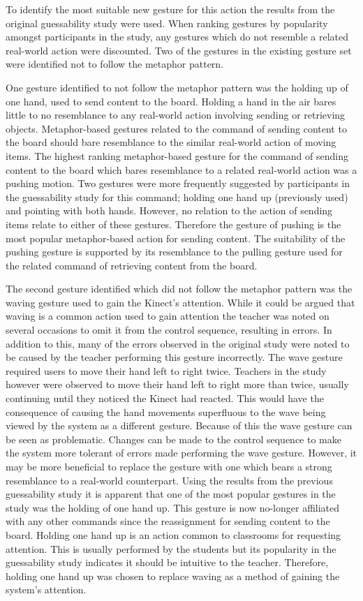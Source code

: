 \documentclass[link]{IWCOMP}
\begin{document}
To identify the most suitable new gesture for this action the results from the original guessability study were used.
When ranking gestures by popularity amongst participants in the study, any gestures which do not resemble a related real-world action were discounted.
Two of the gestures in the existing gesture set were identified not to follow the metaphor pattern.

One gesture identified to not follow the metaphor pattern was the holding up of one hand, used to send content to the board.
Holding a hand in the air bares little to no resemblance to any real-world action involving sending or retrieving objects.
Metaphor-based gestures related to the command of sending content to the board should bare resemblance to the similar real-world action of moving items.
The highest ranking metaphor-based gesture for the command of sending content to the board which bares resemblance to a related real-world action was a pushing motion.
Two gestures were more frequently suggested by participants in the guessability study for this command; holding one hand up (previously used) and pointing with both hands.
However, no relation to the action of sending items relate to either of these gestures.
Therefore the gesture of pushing is the most popular metaphor-based action for sending content.
The suitability of the pushing gesture is supported by its resemblance to the pulling gesture used for the related command of retrieving content from the board.

The second gesture identified which did not follow the metaphor pattern was the waving gesture used to gain the Kinect's attention.
While it could be argued that waving is a common action used to gain attention the teacher was noted on several occasions to omit it from the control sequence, resulting in errors.
In addition to this, many of the errors observed in the original study were noted to be caused by the teacher performing this gesture incorrectly.
The wave gesture required users to move their hand left to right twice.
Teachers in the study however were observed to move their hand left to right more than twice, usually continuing until they noticed the Kinect had reacted.
This would have the consequence of causing the hand movements superfluous to the wave being viewed by the system as a different gesture.
Because of this the wave gesture can be seen as problematic.
Changes can be made to the control sequence to make the system more tolerant of errors made performing the wave gesture.
However, it may be more beneficial to replace the gesture with one which bears a strong resemblance to a real-world counterpart.
Using the results from the previous guessability study it is apparent that one of the most popular gestures in the study was the holding of one hand up.
This gesture is now no-longer affiliated with any other commands since the reassignment for sending content to the board.
Holding one hand up is an action common to classrooms for requesting attention.
This is usually performed by the students but its popularity in the guessability study indicates it should be intuitive to the teacher.
Therefore, holding one hand up was chosen to replace waving as a method of gaining the system's attention.
\end{document}
